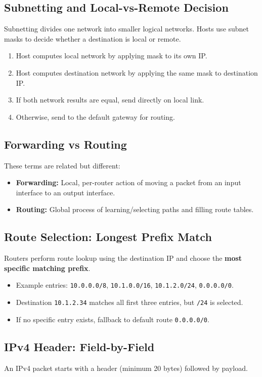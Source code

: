 \documentclass[12pt,a4paper]{article}
\begin{document}
\subsection*{Subnetting and Local-vs-Remote Decision}
Subnetting divides one network into smaller logical networks. Hosts use subnet masks to decide whether a destination is local or remote.
\begin{enumerate}
    \item Host computes local network by applying mask to its own IP.
    \item Host computes destination network by applying the same mask to destination IP.
    \item If both network results are equal, send directly on local link.
    \item Otherwise, send to the default gateway for routing.
\end{enumerate}

\subsection*{Forwarding vs Routing}
These terms are related but different:
\begin{itemize}
    \item \textbf{Forwarding:} Local, per-router action of moving a packet from an input interface to an output interface.
    \item \textbf{Routing:} Global process of learning/selecting paths and filling route tables.
\end{itemize}

\subsection*{Route Selection: Longest Prefix Match}
Routers perform route lookup using the destination IP and choose the \textbf{most specific matching prefix}.
\begin{itemize}
    \item Example entries: \texttt{10.0.0.0/8}, \texttt{10.1.0.0/16}, \texttt{10.1.2.0/24}, \texttt{0.0.0.0/0}.
    \item Destination \texttt{10.1.2.34} matches all first three entries, but \texttt{/24} is selected.
    \item If no specific entry exists, fallback to default route \texttt{0.0.0.0/0}.
\end{itemize}

\subsection*{IPv4 Header: Field-by-Field}
An IPv4 packet starts with a header (minimum 20 bytes) followed by payload.
\end{document}
